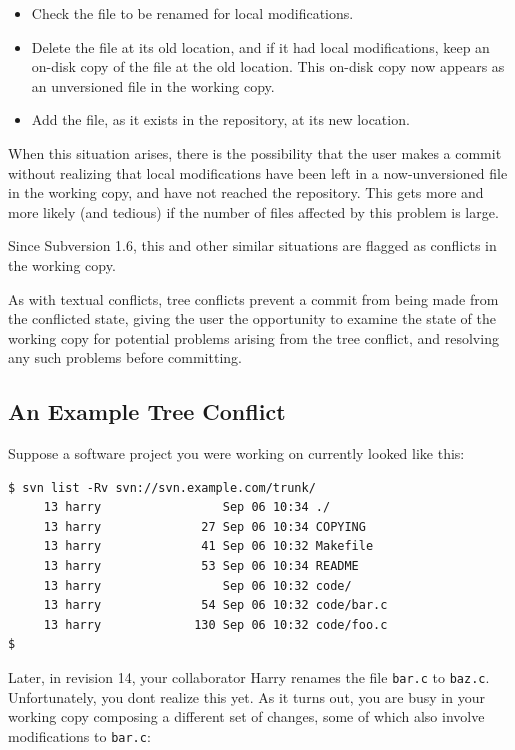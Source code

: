 \begin{itemize}
\item
  Check the file to be renamed for local modifications.
\item
  Delete the file at its old location, and if it had local
  modifications, keep an on-disk copy of the file at the old location.
  This on-disk copy now appears as an unversioned file in the working
  copy.
\item
  Add the file, as it exists in the repository, at its new location.
\end{itemize}

When this situation arises, there is the possibility that the user makes
a commit without realizing that local modifications have been left in a
now-unversioned file in the working copy, and have not reached the
repository. This gets more and more likely (and tedious) if the number
of files affected by this problem is large.

Since Subversion 1.6, this and other similar situations are flagged as
conflicts in the working copy.

As with textual conflicts, tree conflicts prevent a commit from being
made from the conflicted state, giving the user the opportunity to
examine the state of the working copy for potential problems arising
from the tree conflict, and resolving any such problems before
committing.

\subsection{An Example Tree
Conflict}\label{svn.tour.treeconflicts.example}

Suppose a software project you were working on currently looked like
this:

\begin{verbatim}
$ svn list -Rv svn://svn.example.com/trunk/
     13 harry                 Sep 06 10:34 ./
     13 harry              27 Sep 06 10:34 COPYING
     13 harry              41 Sep 06 10:32 Makefile
     13 harry              53 Sep 06 10:34 README
     13 harry                 Sep 06 10:32 code/
     13 harry              54 Sep 06 10:32 code/bar.c
     13 harry             130 Sep 06 10:32 code/foo.c
$
\end{verbatim}

Later, in revision 14, your collaborator Harry renames the file
\texttt{bar.c} to \texttt{baz.c}. Unfortunately, you
don\textquotesingle t realize this yet. As it turns out, you are busy in
your working copy composing a different set of changes, some of which
also involve modifications to \texttt{bar.c}:

